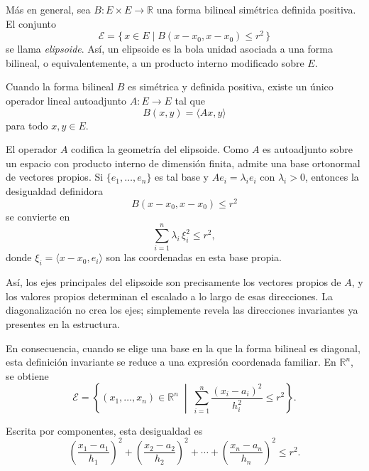 \medskip

Más en general, sea $B:E\times E\to \mathbb{R}$ una forma bilineal simétrica
definida positiva. El conjunto
\[
\mathcal{E}=\{\,x\in E \mid B(x-x_0,x-x_0)\le r^2\,\}
\]
se llama \emph{elipsoide}.
Así, un elipsoide es la bola unidad asociada a una forma bilineal, o
equivalentemente, a un producto interno modificado sobre $E$.

\medskip

Cuando la forma bilineal $B$ es simétrica y definida positiva, existe un
único operador lineal autoadjunto $A:E\to E$ tal que
\[
B(x,y)=\langle Ax,y\rangle
\]
para todo $x,y\in E$.

\medskip

El operador $A$ codifica la geometría del elipsoide.
Como $A$ es autoadjunto sobre un espacio con producto interno de dimensión
finita, admite una base ortonormal de vectores propios.
Si $\{e_1,\dots,e_n\}$ es tal base y $A e_i=\lambda_i e_i$ con
$\lambda_i>0$, entonces la desigualdad definidora
\[
B(x-x_0,x-x_0)\le r^2
\]
se convierte en
\[
\sum_{i=1}^n \lambda_i\, \xi_i^2 \le r^2,
\]
donde $\xi_i=\langle x-x_0,e_i\rangle$ son las coordenadas en esta
base propia.


\medskip

Así, los ejes principales del elipsoide son precisamente los vectores propios
de $A$, y los valores propios determinan el escalado a lo largo de esas
direcciones.
La diagonalización no crea los ejes; simplemente revela las direcciones
invariantes ya presentes en la estructura.

\medskip

En consecuencia, cuando se elige una base en la que la forma bilineal es
diagonal, esta definición invariante se reduce a una expresión coordenada
familiar.
En $\mathbb{R}^n$, se obtiene
\[
\mathcal{E}
=
\left\{
(x_1,\dots,x_n)\in\mathbb{R}^n
\;\middle|\;
\sum_{i=1}^n \frac{(x_i-a_i)^2}{h_i^2} \le r^2
\right\}.
\]

Escrita por componentes, esta desigualdad es
\[
\left(\frac{x_1-a_1}{h_1}\right)^2
+
\left(\frac{x_2-a_2}{h_2}\right)^2
+
\cdots
+
\left(\frac{x_n-a_n}{h_n}\right)^2
\le r^2.
\]

